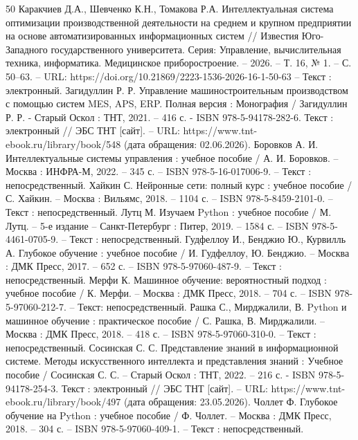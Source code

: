 
\begin{thebibliography}{50}
 Каракчиев Д.А., Шевченко К.Н., Томакова Р.А. Интеллектуальная система оптимизации производственной деятельности на среднем и крупном предприятии на основе автоматизированных информационных систем // Известия Юго-Западного государственного университета. Серия: Управление, вычислительная техника, информатика. Медицинское приборостроение. – 2026. – Т. 16, № 1. – С. 50–63. –  URL: https://doi.org/10.21869/2223-1536-2026-16-1-50-63 – Текст : электронный.
 Загидуллин Р. Р. Управление машиностроительным производством с помощью систем MES, APS, ERP. Полная версия : Монография / Загидуллин Р. Р. - Старый Оскол : ТНТ, 2021. – 416 с. - ISBN 978-5-94178-282-6. Текст : электронный // ЭБС ТНТ [сайт]. – URL: https://www.tnt-ebook.ru/library/book/548 (дата обращения: 02.06.2026).
 Боровков А. И. Интеллектуальные системы управления : учебное пособие / А. И. Боровков. – Москва : ИНФРА-М, 2022. – 345 с. – ISBN 978-5-16-017006-9. – Текст : непосредственный.  
 Хайкин  С. Нейронные сети: полный курс : учебное пособие / С. Хайкин. – Москва : Вильямс, 2018. – 1104 с. – ISBN 978-5-8459-2101-0. – Текст : непосредственный.
 Лутц  М. Изучаем Python : учебное пособие  / М. Лутц. –  5-е издание – Санкт-Петербург : Питер, 2019. – 1584 с. – ISBN 978-5-4461-0705-9. – Текст : непосредственный.
 Гудфеллоу И., Бенджио Ю., Курвилль А. Глубокое обучение : учебное пособие / И. Гудфеллоу, Ю. Бенджио. –  Москва : ДМК Пресс, 2017. – 652 с. – ISBN 978-5-97060-487-9. – Текст : непосредственный.    
 Мерфи К. Машинное обучение: вероятностный подход : учебное пособие / К. Мерфи. – Москва : ДМК Пресс, 2018. – 704 с. – ISBN 978-5-97060-212-7. – Текст: непосредственный.
 Рашка С., Мирджалили, В. Python и машинное обучение : практическое пособие / С. Рашка, В. Мирджалили. – Москва : ДМК Пресс, 2018. – 418 с. – ISBN 978-5-97060-310-0. – Текст : непосредственный.
 Сосинская С. С. Представление знаний в информационной системе. Методы искусственного интеллекта и представления знаний : Учебное пособие / Сосинская С. С. – Старый Оскол : ТНТ, 2022. – 216 с. - ISBN 978-5-94178-254-3. Текст : электронный // ЭБС ТНТ [сайт]. – URL: https://www.tnt-ebook.ru/library/book/497 (дата обращения: 23.05.2026).
 Чоллет Ф. Глубокое обучение на Python : учебное пособие / Ф. Чоллет. – Москва : ДМК Пресс, 2018. – 304 с. – ISBN 978-5-97060-409-1. – Текст : непосредственный.

\end{thebibliography}
